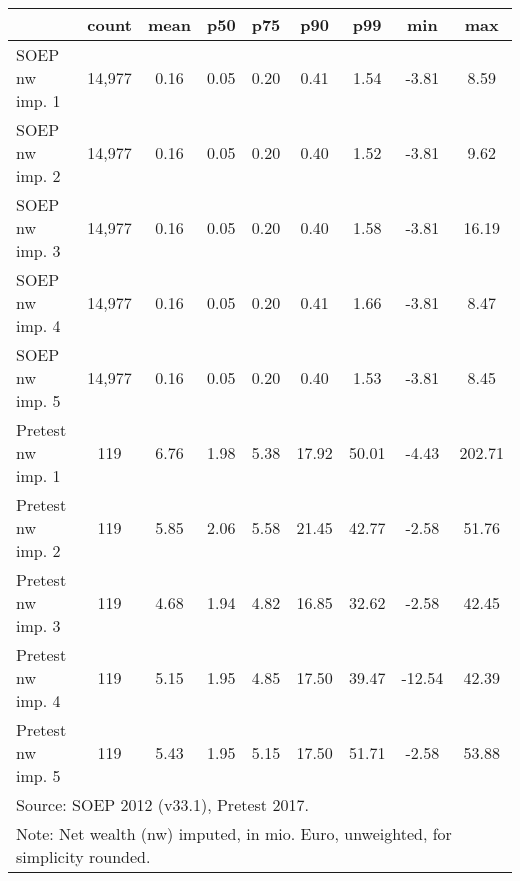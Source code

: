 {
\def\sym#1{\ifmmode^{#1}\else\(^{#1}\)\fi}
\begin{tabular}{l*{1}{cccccccc}}
\hline\hline
                                            &       count&        mean&         p50&         p75&         p90&         p99&         min&         max\\
\hline
SOEP nw imp. 1                              &      14,977&        0.16&        0.05&        0.20&        0.41&        1.54&       -3.81&        8.59\\
SOEP nw imp. 2                              &      14,977&        0.16&        0.05&        0.20&        0.40&        1.52&       -3.81&        9.62\\
SOEP nw imp. 3                              &      14,977&        0.16&        0.05&        0.20&        0.40&        1.58&       -3.81&       16.19\\
SOEP nw imp. 4                              &      14,977&        0.16&        0.05&        0.20&        0.41&        1.66&       -3.81&        8.47\\
SOEP nw imp. 5                              &      14,977&        0.16&        0.05&        0.20&        0.40&        1.53&       -3.81&        8.45\\
Pretest nw imp. 1                           &         119&        6.76&        1.98&        5.38&       17.92&       50.01&       -4.43&      202.71\\
Pretest nw imp. 2                           &         119&        5.85&        2.06&        5.58&       21.45&       42.77&       -2.58&       51.76\\
Pretest nw imp. 3                           &         119&        4.68&        1.94&        4.82&       16.85&       32.62&       -2.58&       42.45\\
Pretest nw imp. 4                           &         119&        5.15&        1.95&        4.85&       17.50&       39.47&      -12.54&       42.39\\
Pretest nw imp. 5                           &         119&        5.43&        1.95&        5.15&       17.50&       51.71&       -2.58&       53.88\\
\hline\hline
\multicolumn{9}{l}{\footnotesize Source: SOEP 2012 (v33.1), Pretest 2017.}\\
\multicolumn{9}{l}{\footnotesize Note: Net wealth (nw) imputed, in mio. Euro, unweighted, for simplicity rounded.}\\
\end{tabular}
}
